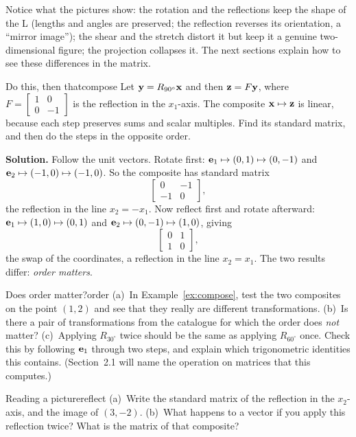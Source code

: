 \documentclass[11pt]{article}
\begin{document}
Notice what the pictures show: the rotation and the reflections keep the shape of the L (lengths and angles are preserved; the reflection reverses its orientation, a ``mirror image''); the shear and the stretch distort it but keep it a genuine two-dimensional figure; the projection collapses it. The next sections explain how to see these differences in the matrix.

\begin{exmp}{Do this, then that}{compose}
Let $\mathbf{y}=R_{90^\circ}\mathbf{x}$ and then $\mathbf{z}=F\mathbf{y}$, where $F=\begin{bmatrix}1&0\\0&-1\end{bmatrix}$ is the reflection in the $x_1$-axis. The composite $\mathbf{x}\mapsto\mathbf{z}$ is linear, because each step preserves sums and scalar multiples. Find its standard matrix, and then do the steps in the opposite order.

\textbf{Solution.} Follow the unit vectors. Rotate first: $\mathbf{e}_1\mapsto(0,1)\mapsto(0,-1)$ and $\mathbf{e}_2\mapsto(-1,0)\mapsto(-1,0)$. So the composite has standard matrix
\[
\begin{bmatrix}0&-1\\-1&0\end{bmatrix},
\]
the reflection in the line $x_2=-x_1$. Now reflect first and rotate afterward: $\mathbf{e}_1\mapsto(1,0)\mapsto(0,1)$ and $\mathbf{e}_2\mapsto(0,-1)\mapsto(1,0)$, giving
\[
\begin{bmatrix}0&1\\1&0\end{bmatrix},
\]
the swap of the coordinates, a reflection in the line $x_2=x_1$. The two results differ: \emph{order matters}.
\end{exmp}

\begin{think}{Does order matter?}{order}
(a)~In Example~\ref{ex:compose}, test the two composites on the point $(1,2)$ and see that they really are different transformations. (b)~Is there a pair of transformations from the catalogue for which the order does \emph{not} matter? (c)~Applying $R_{30^\circ}$ twice should be the same as applying $R_{60^\circ}$ once. Check this by following $\mathbf{e}_1$ through two steps, and explain which trigonometric identities this contains. (Section~2.1 will name the operation on matrices that this computes.)
\end{think}

\begin{kc}{Reading a picture}{reflect}
(a)~Write the standard matrix of the reflection in the $x_2$-axis, and the image of $(3,-2)$. (b)~What happens to a vector if you apply this reflection twice? What is the matrix of that composite?
\end{kc}
\end{document}
